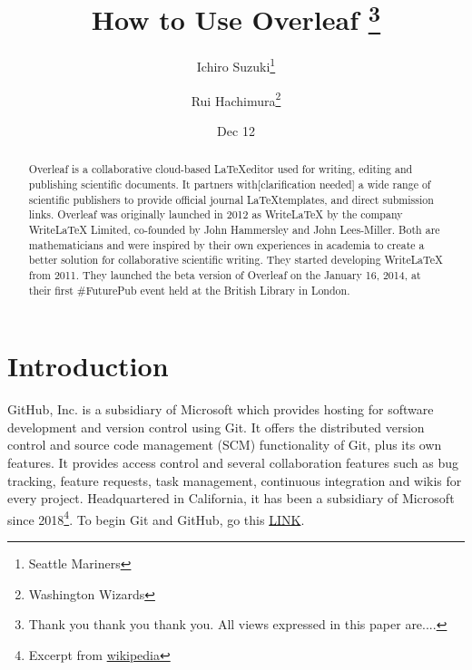 \documentclass[12pt]{article}
\theoremstyle{hypotheses}
\begin{document}

\title{How to Use Overleaf \thanks{Thank you thank you thank you. All views expressed in this paper are....}}

\author{Ichiro Suzuki\thanks{Seattle Mariners}}
\author{Rui Hachimura\thanks{Washington Wizards}}
\date{Dec 12}
\maketitle

\begin{abstract}
Overleaf is a collaborative cloud-based \LaTeX editor used for writing, editing and publishing scientific documents. It partners with[clarification needed] a wide range of scientific publishers to provide official journal \LaTeX templates, and direct submission links. Overleaf was originally launched in 2012 as WriteLaTeX by the company WriteLaTeX Limited, co-founded by John Hammersley and John Lees-Miller. Both are mathematicians and were inspired by their own experiences in academia to create a better solution for collaborative scientific writing. They started developing WriteLaTeX from 2011. They launched the beta version of Overleaf on the January 16, 2014, at their first #FuturePub event held at the British Library in London.
\vspace{0in}\\
\bigskip
\end{abstract}

\clearpage


\doublespacing


\section{Introduction}
GitHub, Inc. is a subsidiary of Microsoft which provides hosting for software development and version control using Git. It offers the distributed version control and source code management (SCM) functionality of Git, plus its own features. It provides access control and several collaboration features such as bug tracking, feature requests, task management, continuous integration and wikis for every project. Headquartered in California, it has been a subsidiary of Microsoft since 2018\footnote{ Excerpt from \href{https://en.wikipedia.org/wiki/GitHub}{wikipedia}}.  To begin Git and GitHub, go this \href{https://happygitwithr.com/}{LINK}.
\end{document}
